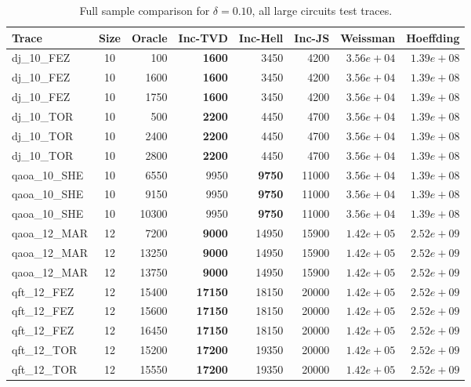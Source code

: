 \begin{table}[ht!]
\centering
\footnotesize
\setlength{\tabcolsep}{3pt}
\renewcommand{\arraystretch}{1.05}
\caption{Full sample comparison for $\delta = 0.10$, all large circuits test traces.}
\label{tab:appendix-sota-d01-l}
\begin{tabular}{l c r r r r r r}
\toprule
Trace & Size & Oracle & Inc-TVD & Inc-Hell & Inc-JS & Weissman & Hoeffding \\
\midrule
dj\_10\_FEZ & 10 & 100 & \textbf{1600} & 3450 & 4200 & $3.56e+04$ & $1.39e+08$ \\
dj\_10\_FEZ & 10 & 1600 & \textbf{1600} & 3450 & 4200 & $3.56e+04$ & $1.39e+08$ \\
dj\_10\_FEZ & 10 & 1750 & \textbf{1600} & 3450 & 4200 & $3.56e+04$ & $1.39e+08$ \\
dj\_10\_TOR & 10 & 500 & \textbf{2200} & 4450 & 4700 & $3.56e+04$ & $1.39e+08$ \\
dj\_10\_TOR & 10 & 2400 & \textbf{2200} & 4450 & 4700 & $3.56e+04$ & $1.39e+08$ \\
dj\_10\_TOR & 10 & 2800 & \textbf{2200} & 4450 & 4700 & $3.56e+04$ & $1.39e+08$ \\
qaoa\_10\_SHE & 10 & 6550 & 9950 & \textbf{9750} & 11000 & $3.56e+04$ & $1.39e+08$ \\
qaoa\_10\_SHE & 10 & 9150 & 9950 & \textbf{9750} & 11000 & $3.56e+04$ & $1.39e+08$ \\
qaoa\_10\_SHE & 10 & 10300 & 9950 & \textbf{9750} & 11000 & $3.56e+04$ & $1.39e+08$ \\
qaoa\_12\_MAR & 12 & 7200 & \textbf{9000} & 14950 & 15900 & $1.42e+05$ & $2.52e+09$ \\
qaoa\_12\_MAR & 12 & 13250 & \textbf{9000} & 14950 & 15900 & $1.42e+05$ & $2.52e+09$ \\
qaoa\_12\_MAR & 12 & 13750 & \textbf{9000} & 14950 & 15900 & $1.42e+05$ & $2.52e+09$ \\
qft\_12\_FEZ & 12 & 15400 & \textbf{17150} & 18150 & 20000 & $1.42e+05$ & $2.52e+09$ \\
qft\_12\_FEZ & 12 & 15600 & \textbf{17150} & 18150 & 20000 & $1.42e+05$ & $2.52e+09$ \\
qft\_12\_FEZ & 12 & 16450 & \textbf{17150} & 18150 & 20000 & $1.42e+05$ & $2.52e+09$ \\
qft\_12\_TOR & 12 & 15200 & \textbf{17200} & 19350 & 20000 & $1.42e+05$ & $2.52e+09$ \\
qft\_12\_TOR & 12 & 15550 & \textbf{17200} & 19350 & 20000 & $1.42e+05$ & $2.52e+09$ \\

\end{tabular}
\end{table}
